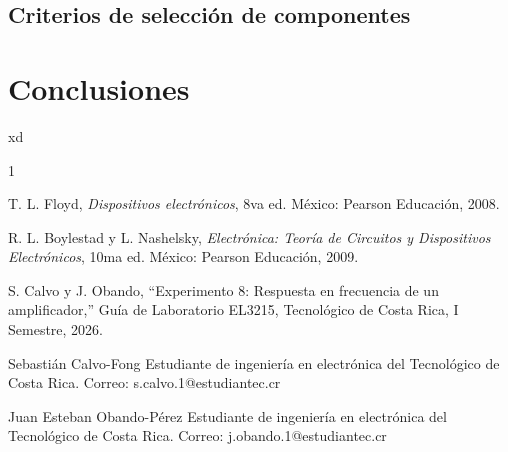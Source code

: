 \documentclass[journal]{IEEEtran}
\begin{document}
\subsection{Criterios de selección de componentes}



\section{Conclusiones}

xd


\begin{thebibliography}{1}

T. L. Floyd, \emph{Dispositivos electrónicos}, 8va ed. México: Pearson Educación, 2008.

R. L. Boylestad y L. Nashelsky, \emph{Electrónica: Teoría de Circuitos y Dispositivos Electrónicos}, 10ma ed. México: Pearson Educación, 2009.

S. Calvo y J. Obando, ``Experimento 8: Respuesta en frecuencia de un amplificador,'' Guía de Laboratorio EL3215, Tecnológico de Costa Rica, I Semestre, 2026.

\end{thebibliography}


\begin{IEEEbiographynophoto}{Sebastián Calvo-Fong}
Estudiante de ingeniería en electrónica del Tecnológico de Costa Rica. 
Correo: s.calvo.1@estudiantec.cr
\end{IEEEbiographynophoto}

\begin{IEEEbiographynophoto}{Juan Esteban Obando-Pérez}
Estudiante de ingeniería en electrónica del Tecnológico de Costa Rica. 
Correo: j.obando.1@estudiantec.cr
\end{IEEEbiographynophoto}

\vfill
\end{document}
